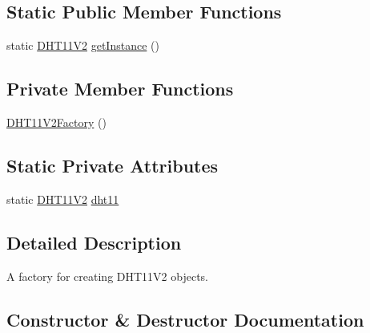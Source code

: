 \subsection*{Static Public Member Functions}
\begin{DoxyCompactItemize}
\item 
static \hyperlink{classcom_1_1libsensorj_1_1concretesensor_1_1DHT11V2}{D\+H\+T11\+V2} \hyperlink{classcom_1_1libsensorj_1_1concretefactory_1_1DHT11V2Factory_abf6c846a1ccc76d082cee9215df1596c}{get\+Instance} ()
\end{DoxyCompactItemize}
\subsection*{Private Member Functions}
\begin{DoxyCompactItemize}
\item 
\hyperlink{classcom_1_1libsensorj_1_1concretefactory_1_1DHT11V2Factory_a6daec5c65e3b39f2e4770a583271a107}{D\+H\+T11\+V2\+Factory} ()
\end{DoxyCompactItemize}
\subsection*{Static Private Attributes}
\begin{DoxyCompactItemize}
\item 
static \hyperlink{classcom_1_1libsensorj_1_1concretesensor_1_1DHT11V2}{D\+H\+T11\+V2} \hyperlink{classcom_1_1libsensorj_1_1concretefactory_1_1DHT11V2Factory_a9ec0e463b94ba2654e29ab495805deeb}{dht11}
\end{DoxyCompactItemize}


\subsection{Detailed Description}
A factory for creating D\+H\+T11\+V2 objects. 

\subsection{Constructor \& Destructor Documentation}
\hypertarget{classcom_1_1libsensorj_1_1concretefactory_1_1DHT11V2Factory_a6daec5c65e3b39f2e4770a583271a107}{}
